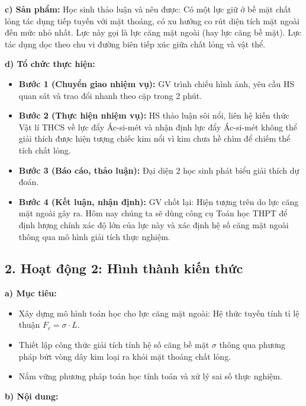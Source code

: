 \documentclass[12pt, a4paper]{article}
\begin{document}
\noindent \textbf{c) Sản phẩm:}
Học sinh thảo luận và nêu được: Có một lực giữ ở bề mặt chất lỏng tác dụng tiếp tuyến với mặt thoáng, có xu hướng co rút diện tích mặt ngoài đến mức nhỏ nhất. Lực này gọi là lực căng mặt ngoài (hay lực căng bề mặt). Lực tác dụng dọc theo chu vi đường biên tiếp xúc giữa chất lỏng và vật thể.

\noindent \textbf{d) Tổ chức thực hiện:}
\begin{itemize}
    \item \textbf{Bước 1 (Chuyển giao nhiệm vụ):} GV trình chiếu hình ảnh, yêu cầu HS quan sát và trao đổi nhanh theo cặp trong 2 phút.
    \item \textbf{Bước 2 (Thực hiện nhiệm vụ):} HS thảo luận sôi nổi, liên hệ kiến thức Vật lí THCS về lực đẩy Ác-si-mét và nhận định lực đẩy Ác-si-mét không thể giải thích được hiện tượng chiếc kim nổi vì kim chưa hề chìm để chiếm thể tích chất lỏng.
    \item \textbf{Bước 3 (Báo cáo, thảo luận):} Đại diện 2 học sinh phát biểu giải thích dự đoán.
    \item \textbf{Bước 4 (Kết luận, nhận định):} GV chốt lại: Hiện tượng trên do lực căng mặt ngoài gây ra. Hôm nay chúng ta sẽ dùng công cụ Toán học THPT để định lượng chính xác độ lớn của lực này và xác định hệ số căng mặt ngoài thông qua mô hình giải tích thực nghiệm.
\end{itemize}

\subsection*{2. Hoạt động 2: Hình thành kiến thức}

\noindent \textbf{a) Mục tiêu:}
\begin{itemize}
    \item Xây dựng mô hình toán học cho lực căng mặt ngoài: Hệ thức tuyến tính tỉ lệ thuận $F_c = \sigma \cdot L$.
    \item Thiết lập công thức giải tích tính hệ số căng bề mặt $\sigma$ thông qua phương pháp bứt vòng dây kim loại ra khỏi mặt thoáng chất lỏng.
    \item Nắm vững phương pháp toán học tính toán và xử lý sai số thực nghiệm.
\end{itemize}

\noindent \textbf{b) Nội dung:}
\end{document}
